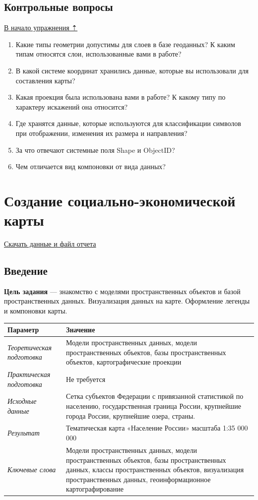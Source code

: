 \documentclass[]{book}
\theoremstyle{definition}
\theoremstyle{definition}
\theoremstyle{definition}
\theoremstyle{remark}
\begin{document}
\hypertarget{map-design-climates-questions}{%
\section{Контрольные вопросы}\label{map-design-climates-questions}}

\protect\hyperlink{map-design-climates}{В начало упражнения ⇡}

\begin{enumerate}
\def\labelenumi{\arabic{enumi}.}
\item
  Какие типы геометрии допустимы для слоев в базе геоданных? К каким
  типам относятся слои, использованные вами в работе?
\item
  В какой системе координат хранились данные, которые вы использовали
  для составления карты?
\item
  Какая проекция была использована вами в работе? К какому типу по
  характеру искажений она относится?
\item
  Где хранятся данные, которые используются для классификации символов
  при отображении, изменения их размера и направления?
\item
  За что отвечают системные поля Shape и ObjectID?
\item
  Чем отличается вид компоновки от вида данных?
\end{enumerate}

\hypertarget{map-design-economic}{%
\chapter{Создание социально-экономической
карты}\label{map-design-economic}}

\href{http://autolab.geogr.msu.ru/gis/data/Ex04.zip}{Скачать данные и
файл отчета}

\hypertarget{map-design-economic-intro}{%
\section{Введение}\label{map-design-economic-intro}}

\textbf{Цель задания} --- знакомство с моделями пространственных
объектов и базой пространственных данных. Визуализация данных на карте.
Оформление легенды и компоновки карты.

\begin{longtable}[]{@{}ll@{}}
\toprule
Параметр & Значение\tabularnewline
\midrule
\endhead
\emph{Теоретическая подготовка} & Модели пространственных данных, модели
пространственных объектов, базы пространственных объектов,
картографические проекции\tabularnewline
\emph{Практическая подготовка} & Не требуется\tabularnewline
\emph{Исходные данные} & Сетка субъектов Федерации с привязанной
статистикой по населению, государственная граница России, крупнейшие
города России, крупнейшие озера, страны.\tabularnewline
\emph{Результат} & Тематическая карта «Население России» масштаба 1:35
000 000\tabularnewline
\emph{Ключевые слова} & Модели пространственных данных, модели
пространственных объектов, базы пространственных данных, классы
пространственных объектов, визуализация пространственных данных,
геоинформационное картографирование\tabularnewline
\bottomrule
\end{longtable}
\end{document}

